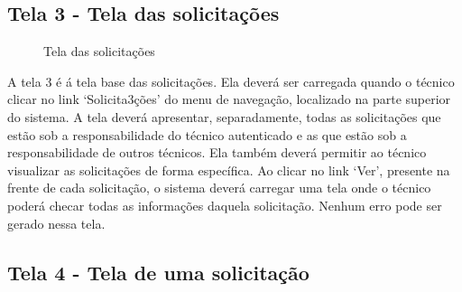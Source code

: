 \newpage

\subsection{Tela 3 - Tela das solicitações}

\begin{figure}[ht]
    \centering
    \caption{Tela das solicitações}
\end{figure}

A tela 3 é á tela base das solicitações. Ela deverá ser carregada quando o técnico clicar no link ‘Solicita3ções’ do menu de navegação, localizado na parte superior do sistema. A tela deverá apresentar, separadamente, todas as solicitações que estão sob a responsabilidade do técnico autenticado e as que estão sob a responsabilidade de outros técnicos. Ela também deverá permitir ao técnico visualizar as solicitações de forma específica. Ao clicar no link ‘Ver’, presente na frente de cada solicitação, o sistema deverá carregar uma tela onde o técnico poderá checar todas as informações daquela solicitação. Nenhum erro pode ser gerado nessa tela.

\newpage

\subsection{Tela 4 - Tela de uma solicitação}

